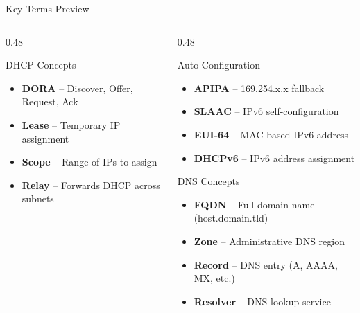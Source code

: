 \documentclass[aspectratio=169, 11pt]{beamer}
\newcommand{\keyterm}[1]{\textbf{\textcolor{rctcblue}{#1}}}
\begin{document}
\begin{frame}{Key Terms Preview}
\begin{columns}[T]
\begin{column}{0.48\textwidth}
            \begin{block}{DHCP Concepts}
                \begin{itemize}\setlength{\itemsep}{1pt}
                    \item \keyterm{DORA} -- Discover, Offer, Request, Ack
                    \item \keyterm{Lease} -- Temporary IP assignment
                    \item \keyterm{Scope} -- Range of IPs to assign
                    \item \keyterm{Relay} -- Forwards DHCP across subnets
                \end{itemize}
            \end{block}
        \end{column}
        \begin{column}{0.48\textwidth}
            \begin{block}{Auto-Configuration}
                \begin{itemize}\setlength{\itemsep}{1pt}
                    \item \keyterm{APIPA} -- 169.254.x.x fallback
                    \item \keyterm{SLAAC} -- IPv6 self-configuration
                    \item \keyterm{EUI-64} -- MAC-based IPv6 address
                    \item \keyterm{DHCPv6} -- IPv6 address assignment
                \end{itemize}
            \end{block}
            
            \begin{block}{DNS Concepts}
                \begin{itemize}\setlength{\itemsep}{1pt}
                    \item \keyterm{FQDN} -- Full domain name (host.domain.tld)
                    \item \keyterm{Zone} -- Administrative DNS region
                    \item \keyterm{Record} -- DNS entry (A, AAAA, MX, etc.)
                    \item \keyterm{Resolver} -- DNS lookup service
                \end{itemize}
            \end{block}
        \end{column}
    \end{columns}
\end{frame}
\end{document}
